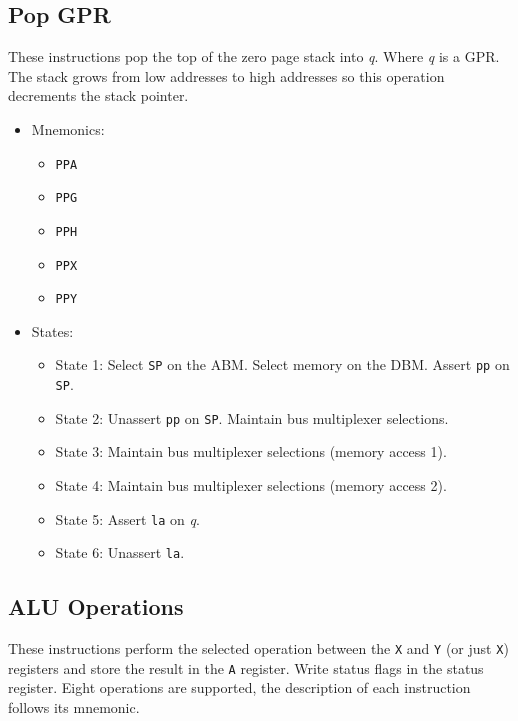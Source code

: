 \documentclass[a4paper,12pt]{article}
\newcommand{\Ar}{\texttt{A}}
\newcommand{\Xr}{\texttt{X}}
\newcommand{\Yr}{\texttt{Y}}
\newcommand{\SP}{\texttt{SP}}
\newcommand{\qq}{\textit{q}}
\begin{document}
\subsection{Pop GPR}
These instructions pop the top of the zero page stack into \qq{}. Where \qq{}
is a GPR. The stack grows from low addresses to high addresses so this 
operation decrements the stack pointer.
\par

\begin{itemize}
\item Mnemonics:
\begin{itemize}
	\item \texttt{PPA}
	\item \texttt{PPG}
	\item \texttt{PPH}
	\item \texttt{PPX}
	\item \texttt{PPY}
\end{itemize}
\item States: 
\begin{itemize}
	\item State 1: Select \SP{} on the ABM. Select memory on the DBM.
	Assert \texttt{pp} on \SP{}.
	\item State 2: Unassert \texttt{pp} on \SP{}. Maintain bus multiplexer
	selections.
	\item State 3: Maintain bus multiplexer selections (memory access 1).
	\item State 4: Maintain bus multiplexer selections (memory access 2).
	\item State 5: Assert \texttt{la} on \qq{}.
	\item State 6: Unassert \texttt{la}.
\end{itemize}
\end{itemize}

\subsection{ALU Operations}
These instructions perform the selected operation between the \Xr{} and \Yr
(or just \Xr{}) registers and store the result in the \Ar{} register. Write
status flags in the status register. Eight operations are supported, the
description of each instruction follows its mnemonic.
\par
\end{document}
